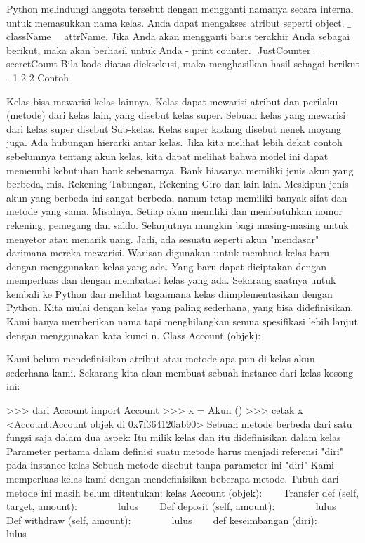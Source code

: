 Python melindungi anggota tersebut dengan mengganti namanya secara internal untuk memasukkan nama kelas. Anda dapat mengakses atribut seperti object. $  \_  $className $  \_  $ $  \_  $attrName. Jika Anda akan mengganti baris terakhir Anda sebagai berikut, maka akan berhasil untuk Anda -
print counter. $  \_  $JustCounter $  \_  $ $  \_  $secretCount
Bila kode diatas dieksekusi, maka menghasilkan hasil sebagai berikut -
1
2
2
Contoh

Kelas bisa mewarisi kelas lainnya. Kelas dapat mewarisi atribut dan perilaku (metode) dari kelas lain, yang disebut kelas super. Sebuah kelas yang mewarisi dari kelas super disebut Sub-kelas. Kelas super kadang disebut nenek moyang juga. Ada hubungan hierarki antar kelas. Jika kita melihat lebih dekat contoh sebelumnya tentang akun kelas, kita dapat melihat bahwa model ini dapat memenuhi kebutuhan bank sebenarnya. Bank biasanya memiliki jenis akun yang berbeda, mis. Rekening Tabungan, Rekening Giro dan lain-lain. Meskipun jenis akun yang berbeda ini sangat berbeda, namun tetap memiliki banyak sifat dan metode yang sama. Misalnya. Setiap akun memiliki dan membutuhkan nomor rekening, pemegang dan saldo. Selanjutnya mungkin bagi masing-masing untuk menyetor atau menarik uang.
Jadi, ada sesuatu seperti akun "mendasar" darimana mereka mewarisi. Warisan digunakan untuk membuat kelas baru dengan menggunakan kelas yang ada. Yang baru dapat diciptakan dengan memperluas dan dengan membatasi kelas yang ada.
Sekarang saatnya untuk kembali ke Python dan melihat bagaimana kelas diimplementasikan dengan Python. Kita mulai dengan kelas yang paling sederhana, yang bisa didefinisikan. Kami hanya memberikan nama tapi menghilangkan semua spesifikasi lebih lanjut dengan menggunakan kata kunci n.
Class Account (objek):

Kami belum mendefinisikan atribut atau metode apa pun di kelas akun sederhana kami. Sekarang kita akan membuat sebuah instance dari kelas kosong ini:

>>> dari Account import Account
>>> x = Akun ()
>>> cetak x
<Account.Account objek di 0x7f364120ab90>
Sebuah metode berbeda dari satu fungsi saja dalam dua aspek:
Itu milik kelas dan itu didefinisikan dalam kelas
Parameter pertama dalam definisi suatu metode harus menjadi referensi "diri" pada instance kelas
Sebuah metode disebut tanpa parameter ini "diri"
Kami memperluas kelas kami dengan mendefinisikan beberapa metode. Tubuh dari metode ini masih belum ditentukan:
kelas Account (objek):
~~~ Transfer def (self, target, amount):
~~~~~~~ lulus
~~~ Def deposit (self, amount):
~~~~~~~ lulus
~~~ Def withdraw (self, amount):
~~~~~~~ lulus
~~~ def keseimbangan (diri):
~~~~~~~ lulus

